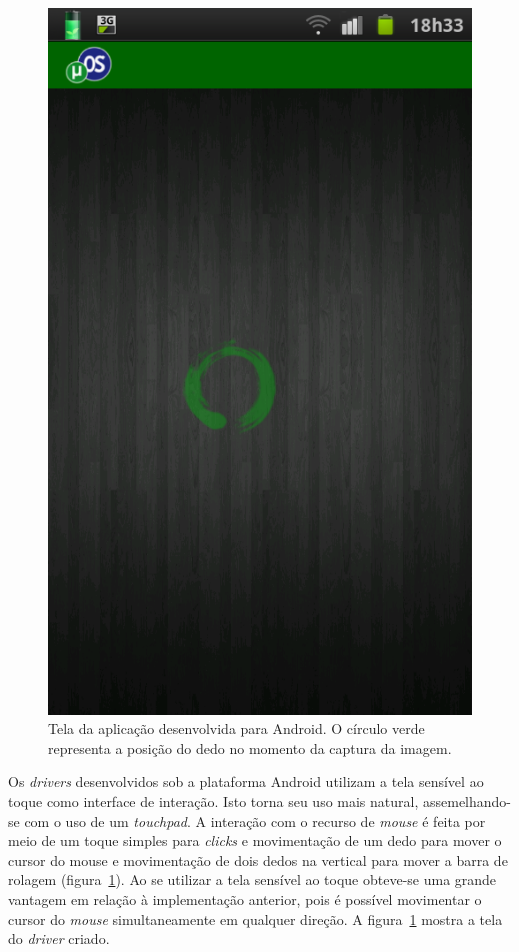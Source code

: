 \begin{figure}[h]
\begin{minipage}[t]{0.30\linewidth}
		\includegraphics[width=\linewidth]{imagens/printscreen_android}
		\caption{Tela da aplicação desenvolvida para Android. O círculo verde representa a posição do dedo no momento da captura da imagem.}
		\label{fig:printscreen_android}
	\end{minipage}
\end{figure}

Os \emph{drivers} desenvolvidos sob a plataforma Android utilizam a tela sensível ao toque como interface de interação. Isto torna seu uso mais natural, assemelhando-se com o uso de um \emph{touchpad}. A interação com o recurso de \emph{mouse} é feita por meio de um toque simples para \emph{clicks} e movimentação de um dedo para mover o cursor do mouse e movimentação de dois dedos na vertical para mover a barra de rolagem (figura~\ref{fig:printscreen_android}). Ao se utilizar a tela sensível ao toque obteve-se uma grande vantagem em relação à implementação anterior, pois é possível movimentar o cursor do \emph{mouse} simultaneamente em qualquer direção. A figura~\ref{fig:printscreen_android} mostra a tela do \emph{driver} criado.	


